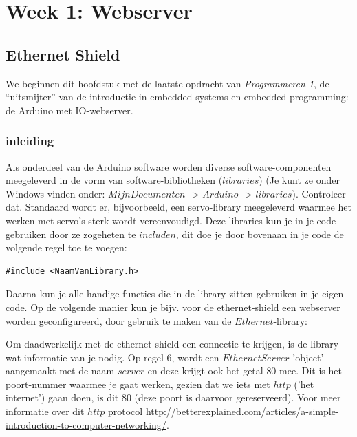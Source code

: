\chapter{Week 1: Webserver}

\section{Ethernet Shield}

We beginnen dit hoofdstuk met de laatste opdracht van \textit{Programmeren 1}, de “uitsmijter” van de introductie in embedded systems en embedded programming: de Arduino met IO-webserver.

\subsection*{inleiding}
Als onderdeel van de Arduino software worden diverse software-componenten meegeleverd in de vorm van software-bibliotheken ($libraries$) (Je kunt ze onder Windows vinden onder: $Mijn Documenten$ -> $Arduino$ -> $libraries$). Controleer dat. Standaard wordt er, bijvoorbeeld, een servo-library meegeleverd waarmee het werken met servo’s sterk wordt vereenvoudigd. Deze libraries kun je in je code gebruiken door ze zogeheten te $includen$, dit doe je door bovenaan in je code de volgende regel toe te voegen:

\begin{lstlisting}[language=Arduino]
#include <NaamVanLibrary.h>
\end{lstlisting}

Daarna kun je alle handige functies die in de library zitten gebruiken in je eigen code. Op de volgende manier kun je bijv. voor de ethernet-shield een webserver worden geconfigureerd, door gebruik te maken van de $Ethernet$-library: \newline



Om daadwerkelijk met de ethernet-shield een connectie te krijgen, is de library wat informatie van je nodig. Op regel $6$, wordt een $EthernetServer$ 'object' aangemaakt met de naam $server$ en deze krijgt ook het getal $80$ mee. Dit is het poort-nummer waarmee je gaat werken, gezien dat we iets met $http$ ('het internet') gaan doen, is dit $80$ (deze poort is daarvoor gereserveerd). Voor meer informatie over dit $http$ protocol\: \url{http://betterexplained.com/articles/a-simple-introduction-to-computer-networking/}. \newline

